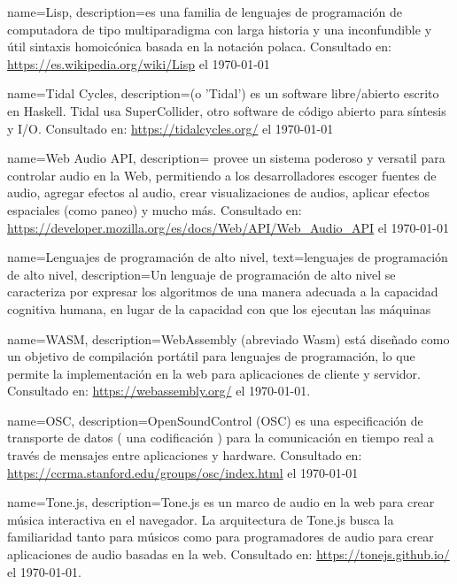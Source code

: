                  {
                   name=Lisp,
    description={es una familia de lenguajes de programación de computadora de tipo multiparadigma con larga historia y una inconfundible y útil sintaxis homoicónica basada en la notación polaca. Consultado en: \url{https://es.wikipedia.org/wiki/Lisp} el \today}}



                 {
                   name=Tidal Cycles,
    description={(o 'Tidal') es un software libre/abierto escrito en Haskell. Tidal usa SuperCollider, otro software de código abierto para síntesis y I/O. Consultado en: \url{https://tidalcycles.org/} el \today}}


                 {
                   name=Web Audio API,
    description={
provee un sistema poderoso y versatil para controlar audio en la Web, permitiendo a los desarrolladores escoger fuentes de audio, agregar efectos al audio, crear visualizaciones de audios, aplicar efectos espaciales (como paneo) y mucho más. Consultado en: \url{https://developer.mozilla.org/es/docs/Web/API/Web_Audio_API} el \today}}

                 {
                   name=Lenguajes de programación de alto nivel,
                   text=lenguajes de programación de alto nivel, 
    description={Un lenguaje de programación de alto nivel se caracteriza por expresar los algoritmos de una manera adecuada a la capacidad cognitiva humana, en lugar de la capacidad con que los ejecutan las máquinas}}


                 {
                   name=WASM,
    description={WebAssembly (abreviado Wasm) está diseñado como un objetivo de compilación portátil para lenguajes de programación, lo que permite la implementación en la web para aplicaciones de cliente y servidor. Consultado en: \url{https://webassembly.org/} el \today.}}


                 {
                   name=OSC,
    description={OpenSoundControl (OSC) es una especificación de transporte de datos ( una codificación ) para la comunicación en tiempo real a través de mensajes entre aplicaciones y hardware. Consultado en: \url{https://ccrma.stanford.edu/groups/osc/index.html} el \today}}


                 {
                   name=Tone.js,
    description={Tone.js es un marco de audio en la web para crear  música interactiva en el navegador. La arquitectura de Tone.js busca la familiaridad tanto para músicos como para programadores de audio para crear aplicaciones de audio basadas en la web. Consultado en: \url{https://tonejs.github.io/} el \today.}}


